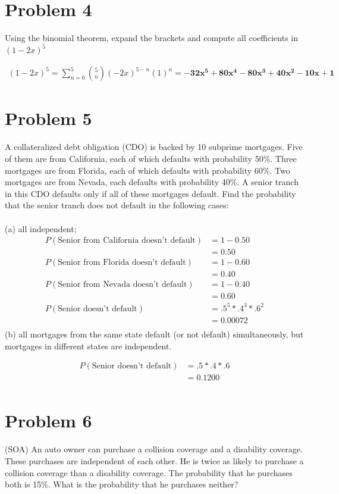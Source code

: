 \documentclass{article}
\begin{document}
\section*{Problem 4} 
Using the binomial theorem, expand the brackets and compute all coefficients in 
$(1 - 2x)^5$ 
	
	\begin{align*}
	(1-2x)^5 = \sum_{n=0}^{5} {5 \choose n} (-2x)^{5-n} (1)^n = \mathbf{-32x^5 + 80x^4 - 80x^3 + 40x^2 -10x + 1     }
	\end{align*}
	
\section*{Problem 5} 
A collateralized debt obligation (CDO) is backed by 10 subprime mortgages. Five of them are from California, each of which defaults with probability 50\%. Three mortgages are from Florida, each of which defaults with probability 60\%. Two mortgages are from Nevada, each defaults with probability 40\%. A senior tranch in this CDO defaults only if all of these mortgages default. Find the probability that the senior tranch does not default in the following cases: \\\\
(a) all independent; \\
	\begin{align*}
	P(\text{Senior from California doesn't default}) &= 1-0.50 \\ &= 0.50 \\
	P(\text{Senior from Florida doesn't default}) &= 1-0.60 \\ &= 0.40 \\
	P(\text{Senior from Nevada doesn't default}) &= 1-0.40 \\ &= 0.60 \\
	P(\text{Senior doesn't default}) &= .5 ^5 * .4^3 * .6^2 \\ &= \mathbf{0.00072 }\\
	\end{align*}
(b) all mortgages from the same state default (or not default) simultaneously, but mortgages in different states are independent. 
	
	\begin{align*}
	P(\text{Senior doesn't default}) &= .5  * .4 * .6 \\ &= \mathbf{0.1200 }\\
	\end{align*}
	
\section*{Problem 6} 
 (SOA) An auto owner can purchase a collision coverage and a disability coverage. These purchases are independent of each other. He is twice as likely to purchase a collision coverage than a disability coverage. The probability that he purchases both is 15\%. What is the probability that he purchases neither?
 
\end{document}
